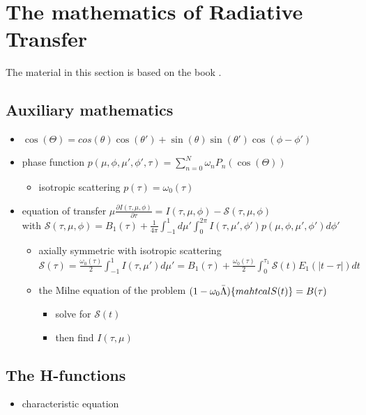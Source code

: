 \documentclass[../main/main.tex]{subfiles}
\begin{document}
\section{The mathematics of Radiative Transfer}
The material in this section is based on the book \cite{Busbridge}.

\subsection{Auxiliary mathematics}

\begin{itemize}
\item $\cos(\Theta) = cos(\theta)\cos(\theta') + \sin(\theta)\sin(\theta') \cos(\phi-\phi')$

\item phase function $\boxed{p(\mu,\phi,\mu',\phi',\tau) = \sum_{n=0}^N \omega_n P_n(\cos(\Theta))}$
\begin{itemize}

\item isotropic scattering $p(\tau) = \omega_0(\tau)$
\end{itemize}

\item equation of transfer $\boxed{\mu \frac{\partial I(\tau,\mu,\phi)}{\partial \tau} = I(\tau,\mu,\phi) - \mathcal{S}(\tau,\mu,\phi)}$ 
\\ with $\mathcal{S}(\tau,\mu,\phi) = B_1(\tau) + \frac{1}{4 \pi} \int_{-1}^{1} d\mu' \int_0^{2\pi} I(\tau,\mu',\phi') p(\mu,\phi,\mu',\phi') d\phi'$
\begin{itemize}
\item axially symmetric with isotropic scattering \\
$\mathcal{S}(\tau) = \frac{\omega_0(\tau)}{2} \int_{-1}^{1} I(\tau,\mu') d\mu' = 
B_1(\tau) + \frac{\omega_0(\tau)}{2} \int_0^{\tau_1} \mathcal{S} (t) E_1(|t-\tau|)dt $
\item the Milne equation of the problem $(1-\omega_0 \bar{\Lambda})\{ \\mahtcal{S}(t)\} = B(\tau)$
\begin{itemize}
\item solve for $\mathcal{S}(t)$
\item then find $I(\tau,\mu)$
\end{itemize}

\end{itemize}
\end{itemize}

\subsection{The H-functions}
\begin{itemize}
\item characteristic equation
\end{itemize}
\end{document}
